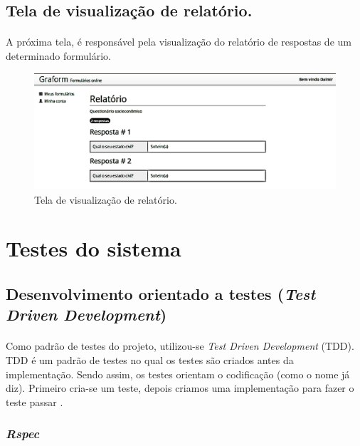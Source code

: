 \documentclass[11pt]{article}
\begin{document}
    \subsection{Tela de visualização de relatório.}
    
    \paragraph{}
    A próxima tela, é responsável pela visualização do relatório de respostas
    de um determinado formulário.
        
    \begin{figure}[h!]
      \centering
      \includegraphics[width=.9\textwidth]{view_report.png}
      \caption{Tela de visualização de relatório.}
    \end{figure}
        
  \clearpage
      
  \section{Testes do sistema}
  
    \subsection{Desenvolvimento orientado a testes ({\em Test Driven Development})}
    
    \paragraph{}

    Como padrão de testes do projeto, utilizou-se {\em Test Driven 
    Development} (TDD). TDD é um padrão de testes no qual os testes são
    criados antes da implementação. Sendo assim, os testes orientam o
    codificação (como o nome já diz). Primeiro cria-se um teste, depois 
    criamos uma implementação para fazer o teste passar \cite{urubatan}.
     
    \subsubsection{{\em Rspec}}
  
\end{document}
